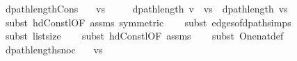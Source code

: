 \begin{isabellebody}
{\isafoldproof}%
%
\isadelimproof
\isanewline
%
\endisadelimproof
%
\isadeliminvisible
\isanewline
%
\endisadeliminvisible
%
\isataginvisible
{}\isamarkupfalse%
\ dpath{\isacharunderscore}{\kern0pt}length{\isacharunderscore}{\kern0pt}Cons{\isacharcolon}{\kern0pt}\isanewline
\ \ \ {\isachardoublequoteopen}vs\ {\isasymnoteq}\ {\isacharbrackleft}{\kern0pt}{\isacharbrackright}{\kern0pt}{\isachardoublequoteclose}\isanewline
\ \ \ {\isachardoublequoteopen}dpath{\isacharunderscore}{\kern0pt}length\ {\isacharparenleft}{\kern0pt}v\ {\isacharhash}{\kern0pt}\ vs{\isacharparenright}{\kern0pt}\ {\isacharequal}{\kern0pt}\ dpath{\isacharunderscore}{\kern0pt}length\ vs\ {\isacharplus}{\kern0pt}\ {}{\isachardoublequoteclose}%
\endisataginvisible
{\isafoldinvisible}%
%
\isadeliminvisible
\isanewline
%
\endisadeliminvisible
%
\isadelimproof
\ \ %
\endisadelimproof
%
\isatagproof
{}\isamarkupfalse%
\ {\isacharparenleft}{\kern0pt}subst\ hd{\isacharunderscore}{\kern0pt}Cons{\isacharunderscore}{\kern0pt}tl{\isacharbrackleft}{\kern0pt}OF\ assms{\isacharcomma}{\kern0pt}\ symmetric{\isacharbrackright}{\kern0pt}{\isacharparenright}{\kern0pt}\isanewline
\ \ \isamarkupfalse%
\ {\isacharparenleft}{\kern0pt}subst\ edges{\isacharunderscore}{\kern0pt}of{\isacharunderscore}{\kern0pt}dpath{\isachardot}{\kern0pt}simps{\isacharparenleft}{\kern0pt}{}{\isacharparenright}{\kern0pt}{\isacharparenright}{\kern0pt}\isanewline
\ \ \isamarkupfalse%
\ {\isacharparenleft}{\kern0pt}subst\ list{\isachardot}{\kern0pt}size{\isacharparenleft}{\kern0pt}{}{\isacharparenright}{\kern0pt}{\isacharparenright}{\kern0pt}\isanewline
\ \ \isamarkupfalse%
\ {\isacharparenleft}{\kern0pt}subst\ hd{\isacharunderscore}{\kern0pt}Cons{\isacharunderscore}{\kern0pt}tl{\isacharbrackleft}{\kern0pt}OF\ assms{\isacharbrackright}{\kern0pt}{\isacharparenright}{\kern0pt}\isanewline
\ \ \isamarkupfalse%
\ {\isacharparenleft}{\kern0pt}subst\ One{\isacharunderscore}{\kern0pt}nat{\isacharunderscore}{\kern0pt}def{\isacharparenright}{\kern0pt}\isanewline
\ \ \isacommand{{\isachardot}{\kern0pt}{\isachardot}{\kern0pt}}\isamarkupfalse%
%
\endisatagproof
{\isafoldproof}%
%
\isadelimproof
\isanewline
%
\endisadelimproof
%
\isadeliminvisible
\isanewline
%
\endisadeliminvisible
%
\isataginvisible
{}\isamarkupfalse%
\ dpath{\isacharunderscore}{\kern0pt}length{\isacharunderscore}{\kern0pt}snoc{\isacharcolon}{\kern0pt}\isanewline
\ \ \ {\isachardoublequoteopen}vs\ {\isasymnoteq}\ {\isacharbrackleft}{\kern0pt}{\isacharbrackright}{\kern0pt}{\isachardoublequoteclose}\isanewline

\end{isabellebody}
